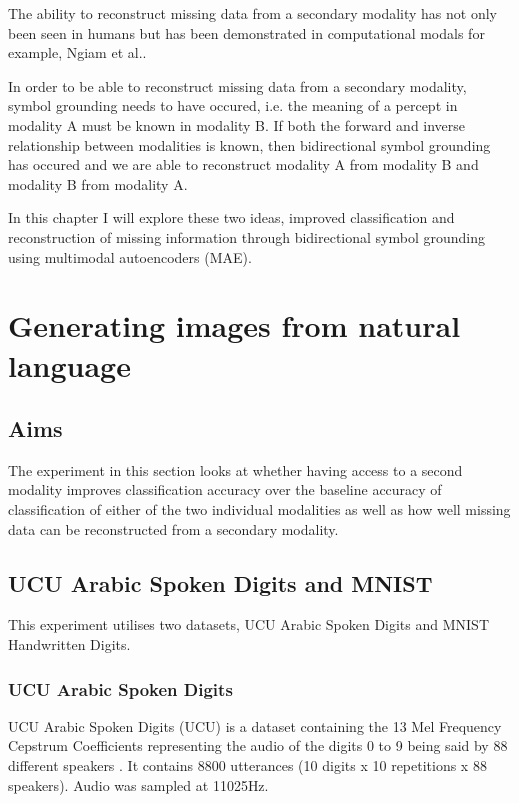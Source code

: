 The ability to reconstruct missing data from a secondary modality has not only been seen in humans \cite{ma2009lip, samuel1997lexical} but has been demonstrated in computational modals for example, Ngiam et al.\cite{ngiam2011multimodal}.

In order to be able to reconstruct missing data from a secondary modality, symbol grounding needs to have occured, i.e. the meaning of a percept in modality A must be known in modality B.
If both the forward and inverse relationship between modalities is known, then bidirectional symbol grounding has occured and we are able to reconstruct modality A from modality B and modality B from modality A.

In this chapter I will explore these two ideas, improved classification and reconstruction of missing information through  bidirectional symbol grounding using multimodal autoencoders (MAE).



\section{Generating images from natural language}
\subsection{Aims}
The experiment in this section looks at whether having access to a second modality improves classification accuracy over the baseline accuracy of classification of either of the two individual modalities as well as how well missing data can be reconstructed from a secondary modality.

\subsection{UCU Arabic Spoken Digits and MNIST} 
\label{sec:UCU}
This experiment utilises two datasets, UCU Arabic Spoken Digits and MNIST Handwritten Digits.

\subsubsection{UCU Arabic Spoken Digits}
UCU Arabic Spoken Digits (UCU) is a dataset containing the 13 Mel Frequency Cepstrum Coefficients representing the audio of the digits 0 to 9 being said by 88 different speakers \cite{hammami2009tree,hammami2010improved}. It contains 8800 utterances (10 digits x 10 repetitions x 88 speakers). Audio was sampled at 11025Hz.

